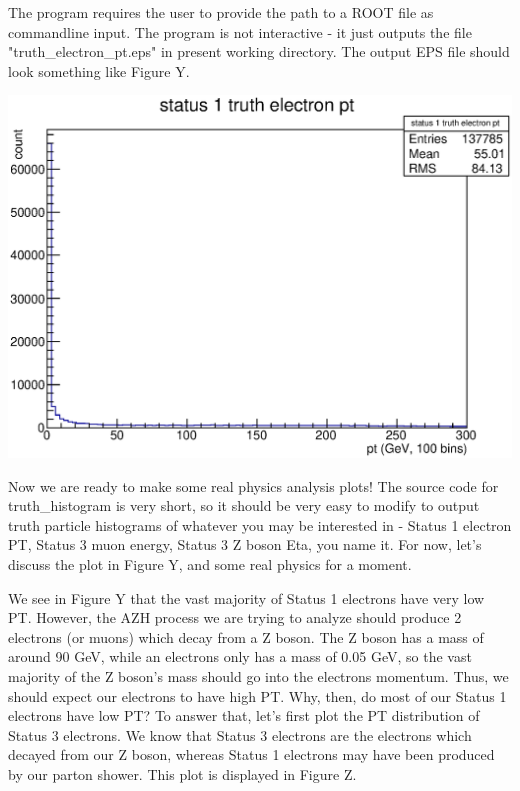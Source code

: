 \documentclass{article}
\begin{document}
The program requires the user to provide the path to a ROOT file as commandline input. The program is not interactive - it just outputs the file "truth\_electron\_pt.eps" in present working directory. The output EPS file should look something like Figure Y.

\bigskip

\includegraphics[width = \linewidth]{truth_electron_1_pt.eps}

\bigskip

Now we are ready to make some real physics analysis plots! The source code for truth\_histogram is very short, so it should be very easy to modify to output truth particle histograms of whatever you may be interested in - Status 1 electron PT, Status 3 muon energy, Status 3 Z boson Eta, you name it. For now, let's discuss the plot in Figure Y, and some real physics for a moment.

\bigskip

We see in Figure Y that the vast majority of Status 1 electrons have very low PT. However, the AZH process we are trying to analyze should produce 2 electrons (or muons) which decay from a Z boson. The Z boson has a mass of around 90 GeV, while an electrons only has a mass of 0.05 GeV, so the vast majority of the Z boson's mass should go into the electrons momentum. Thus, we should expect our electrons to have high PT. Why, then, do most of our Status 1 electrons have low PT? To answer that, let's first plot the PT distribution of Status 3 electrons. We know that Status 3 electrons are the electrons which decayed from our Z boson, whereas Status 1 electrons may have been produced by our parton shower. This plot is displayed in Figure Z.
\end{document}

